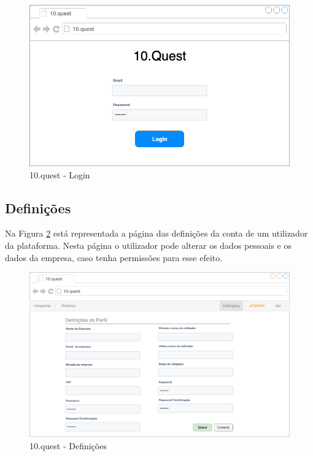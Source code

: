 \begin{figure}[ht!]
	\begin{center}
		\includegraphics[width=1\textwidth]{img/prototipos/1.png}
		\caption{10.quest - Login}
		\label{10q-login}
	\end{center}
\end{figure}

\subsection{Definições}

Na Figura \ref{10q-def} está representada a página das definições da conta de um utilizador da plataforma. Nesta página o utilizador pode alterar os dados pessoais e os dados da empresa, caso tenha permissões para esse efeito.

\newpage

\begin{figure}[ht!]
	\begin{center}
		\includegraphics[width=1\textwidth]{img/prototipos/def.png}
		\caption{10.quest - Definições}
		\label{10q-def}
	\end{center}
\end{figure}

